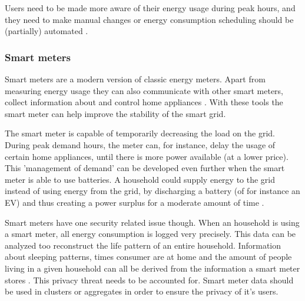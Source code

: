 Users need to be made more aware of their energy usage during peak hours, and they need to make manual changes \cite{Mohsenian-RadLeon-Garcia2010} or energy consumption scheduling should be (partially) automated  \cite{SamadiMohsenian-RadSchoberEtAl2012}.

\subsubsection{Smart meters}

Smart meters are a modern version of classic energy meters. Apart from measuring energy usage they can also communicate with other smart meters, collect information about and control home appliances \cite{DepuruWangDevabhaktuni2011a}. With these tools the smart meter can help improve the stability of the smart grid.

The smart meter is capable of temporarily decreasing the load on the grid. During peak demand hours, the meter can, for instance, delay the usage of certain home appliances, until there is more power available (at a lower price). 
This 'management of demand' can be developed even further when the smart meter is able to use batteries. A household could supply energy to the grid instead of using energy from the grid, by discharging a battery (of for instance an EV) and thus creating a power surplus for a moderate amount of time \cite{MwasiluJustoKimEtAl2014}. 

Smart meters have one security related issue though. When an household is using a smart meter, all energy consumption is logged very precisely. This data can be analyzed too reconstruct the life pattern of an entire household. Information about sleeping patterns, times consumer are at home and the amount of people living in a given household can all be derived from the information a smart meter stores \cite{Molina-MarkhamShenoyFuEtAl2010}. This privacy threat needs to be accounted for. Smart meter data should be used in clusters or aggregates in order to ensure the privacy of it's users.

